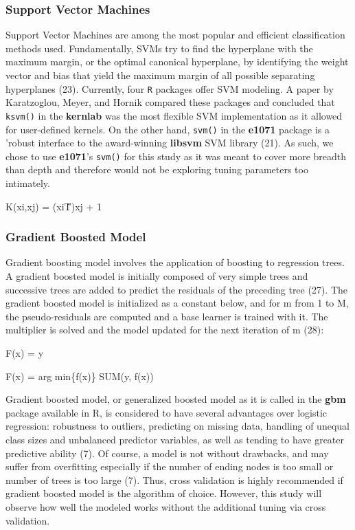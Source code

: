 \documentclass[a4paper]{article}
\begin{document}
\begin{multicols}{2}
\subsubsection*{Support Vector Machines}
Support Vector Machines are among the most popular and efficient classification methods used. Fundamentally, SVMs try to find the hyperplane with the maximum margin, or the optimal canonical hyperplane, by identifying the weight vector and bias that yield the maximum margin of all possible separating hyperplanes (23). Currently, four \texttt{R} packages offer SVM modeling. A paper by Karatzoglou, Meyer, and Hornik compared these packages and concluded that \texttt{ksvm()} in the \textbf{kernlab} was the most flexible SVM implementation as it allowed for user-defined kernels. On the other hand, \texttt{svm()} in the \textbf{e1071} package is a 'robust interface to the award-winning \textbf{libsvm} SVM library (21). As such, we chose to use \textbf{e1071}'s \texttt{svm()} for this study as it was meant to cover more breadth than depth and therefore would not be exploring tuning parameters too intimately.
\begin{center}
K(xi,xj) = (xi\^T)xj + 1
\end{center}

\subsubsection*{Gradient Boosted Model}
Gradient boosting model involves the application of boosting to regression trees. A gradient boosted model is initially composed of very simple trees and successive trees are added to predict the residuals of the preceding tree (27). The gradient boosted model is initialized as a constant below, and for m from 1 to M, the pseudo-residuals are computed and a base learner is trained with it. The multiplier is solved and the model updated for the next iteration of m (28):
\begin{center}
F(x) =  y

F(x) = arg min\{f(x)\} SUM(y, f(x))
\end{center}
Gradient boosted model, or generalized boosted model as it is called in the \textbf{gbm} package available in R, is considered to have several advantages over logistic regression: robustness to outliers, predicting on missing data, handling of unequal class sizes and unbalanced predictor variables, as well as tending to have greater predictive ability (7). Of course, a model is not without drawbacks, and may suffer from overfitting especially if the number of ending nodes is too small or number of trees is too large (7). Thus, cross validation is highly recommended if gradient boosted model is the algorithm of choice. However, this study will observe how well the modeled works without the additional tuning via cross validation.


\end{multicols}
\end{document}
